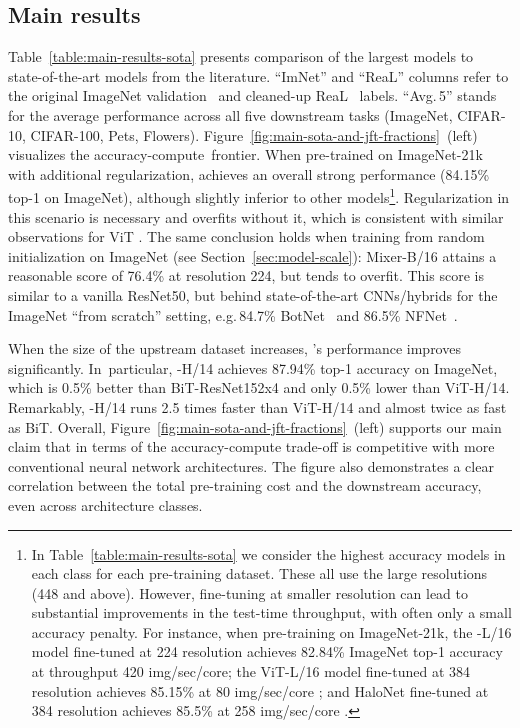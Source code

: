 \subsection{Main results}
\label{subsec:main-results}

Table~\ref{table:main-results-sota} presents comparison of the largest \name{} models to state-of-the-art models from the literature.
``ImNet'' and ``ReaL'' columns refer to the original ImageNet validation~\citep{deng2009-imagenet} and cleaned-up ReaL~\citep{beyer2020-imagenet} labels.
``Avg.\,5'' stands for the average performance across all five downstream tasks (ImageNet, CIFAR-10, CIFAR-100, Pets, Flowers).
Figure~\ref{fig:main-sota-and-jft-fractions}~(left) visualizes the accuracy-compute~frontier.
When pre-trained on ImageNet-21k with additional regularization, \name{} achieves an overall strong performance (84.15\% top-1 on ImageNet), although slightly inferior to other models\footnote{
In Table~\ref{table:main-results-sota} we consider the highest accuracy models in each class for each pre-training dataset.
These all use the large resolutions (448 and above).
However, fine-tuning at smaller resolution can lead to substantial improvements in the test-time throughput, with often only a small accuracy penalty.
For instance, when pre-training on ImageNet-21k,
the \name{}-L/16 model fine-tuned at 224 resolution achieves 82.84\% ImageNet top-1 accuracy at throughput 420 img/sec/core;
the ViT-L/16 model fine-tuned at 384 resolution achieves 85.15\% at 80 img/sec/core \cite{Dosovitskiy2021};
and HaloNet fine-tuned at 384 resolution achieves 85.5\% at 258 img/sec/core \cite{vaswani2021scaling}.
}.
Regularization in this scenario is necessary and \name{} overfits without it, which is consistent with similar observations for ViT \cite{Dosovitskiy2021}.
The same conclusion holds when training \name{} from random initialization on ImageNet (see Section~\ref{sec:model-scale}):
Mixer-B/16 attains a reasonable score of 76.4\% at resolution 224, but tends to overfit.
This score is similar to a vanilla ResNet50, but behind state-of-the-art CNNs/hybrids for the ImageNet ``from scratch'' setting, e.g.\,84.7\% BotNet~\cite{srinivas2021bottleneck} and 86.5\%
NFNet~\cite{brock2021high}.

When the size of the upstream dataset increases, \name{}'s performance improves significantly.
In~particular, \name{}-H/14 achieves 87.94\% top-1 accuracy on ImageNet, which is 0.5\% better than BiT-ResNet152x4 and only 0.5\% lower than ViT-H/14.
Remarkably, \name{}-H/14 runs 2.5 times faster than ViT-H/14 and almost twice as fast as BiT. 
Overall, Figure~\ref{fig:main-sota-and-jft-fractions}~(left) supports our main claim that in terms of the accuracy-compute trade-off \name{} is competitive with more conventional neural network architectures. The figure also demonstrates a clear correlation between the total pre-training cost and the downstream accuracy, even across architecture classes.

